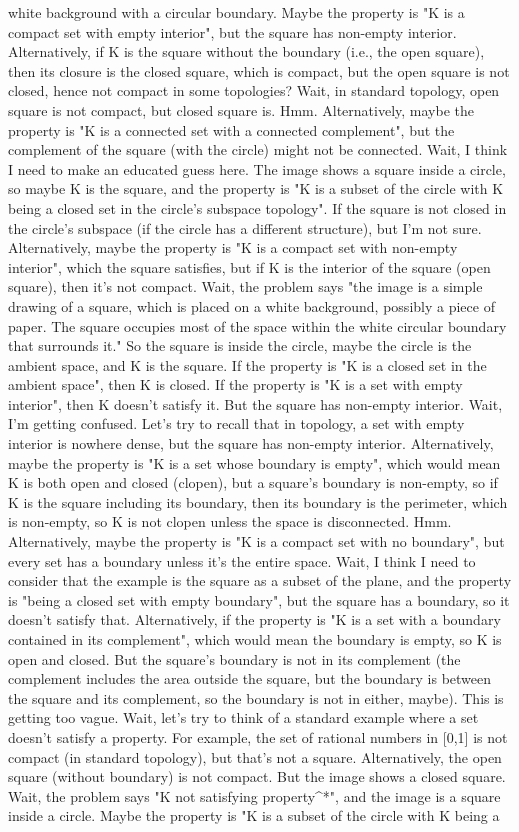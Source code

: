 white background with a circular boundary. Maybe the property is "K is a compact set with empty interior", but the square has non-empty interior. Alternatively, if K is the square without the boundary (i.e., the open square), then its closure is the closed square, which is compact, but the open square is not closed, hence not compact in some topologies? Wait, in standard topology, open square is not compact, but closed square is. Hmm. Alternatively, maybe the property is "K is a connected set with a connected complement", but the complement of the square (with the circle) might not be connected. Wait, I think I need to make an educated guess here. The image shows a square inside a circle, so maybe K is the square, and the property is "K is a subset of the circle with K being a closed set in the circle's subspace topology". If the square is not closed in the circle's subspace (if the circle has a different structure), but I'm not sure. Alternatively, maybe the property is "K is a compact set with non-empty interior", which the square satisfies, but if K is the interior of the square (open square), then it's not compact. Wait, the problem says "the image is a simple drawing of a square, which is placed on a white background, possibly a piece of paper. The square occupies most of the space within the white circular boundary that surrounds it." So the square is inside the circle, maybe the circle is the ambient space, and K is the square. If the property is "K is a closed set in the ambient space", then K is closed. If the property is "K is a set with empty interior", then K doesn't satisfy it. But the square has non-empty interior. Wait, I'm getting confused. Let's try to recall that in topology, a set with empty interior is nowhere dense, but the square has non-empty interior. Alternatively, maybe the property is "K is a set whose boundary is empty", which would mean K is both open and closed (clopen), but a square's boundary is non-empty, so if K is the square including its boundary, then its boundary is the perimeter, which is non-empty, so K is not clopen unless the space is disconnected. Hmm. Alternatively, maybe the property is "K is a compact set with no boundary", but every set has a boundary unless it's the entire space. Wait, I think I need to consider that the example is the square as a subset of the plane, and the property is "being a closed set with empty boundary", but the square has a boundary, so it doesn't satisfy that. Alternatively, if the property is "K is a set with a boundary contained in its complement", which would mean the boundary is empty, so K is open and closed. But the square's boundary is not in its complement (the complement includes the area outside the square, but the boundary is between the square and its complement, so the boundary is not in either, maybe). This is getting too vague. Wait, let's try to think of a standard example where a set doesn't satisfy a property. For example, the set of rational numbers in [0,1] is not compact (in standard topology), but that's not a square. Alternatively, the open square (without boundary) is not compact. But the image shows a closed square. Wait, the problem says "K not satisfying property^*", and the image is a square inside a circle. Maybe the property is "K is a subset of the circle with K being a 